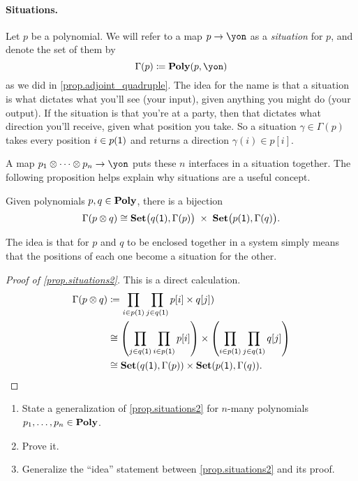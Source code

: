 \documentclass[Book-Poly]{subfiles}
\begin{document}
\paragraph{Situations.} %
Let $p$ be a polynomial. We will refer to a map $p\to\yon$ as a \emph{situation} for $p$, and denote the set of them by
\[
\Gamma(p)\coloneqq\poly(p,\yon)
\]
as we did in \cref{prop.adjoint_quadruple}. The idea for the name is that a situation is what dictates what you'll see (your input), given anything you might do (your output). If the situation is that you're at a party, then that dictates what direction you'll receive, given what position you take. So a situation $\gamma\in\Gamma(p)$ takes every position $i\in p(\textsf{1})$ and returns a direction $\gamma(i)\in p[i]$.

A map $p_1\otimes \cdots \otimes p_n\to\yon$ puts these $n$ interfaces in a situation together. The following proposition helps explain why situations are a useful concept.

\begin{proposition}\label{prop.situations2}
Given polynomials $p,q\in\mathbf{Poly}$, there is a bijection
\[
\Gamma(p\otimes q)\cong\mathbf{Set}\big(q(\textsf{1}),\Gamma(p)\big)\;\times\;\mathbf{Set}\big(p(\textsf{1}),\Gamma(q)\big).
\]
\end{proposition}
The idea is that for $p$ and $q$ to be enclosed together in a system simply means that the positions of each one become a situation for the other. 
\begin{proof}[Proof of \cref{prop.situations2}]
This is a direct calculation.
\begin{align*}
	\Gamma(p\otimes q) &\coloneqq
	\prod_{i\in p(\textsf{1})}\prod_{j\in q(\textsf{1})}p[i]\times q[j]) \\
	&\cong
	\left(\prod_{j\in q(\textsf{1})}\prod_{i\in p(\textsf{1})}p[i]\right)\times
		 \left(\prod_{i\in p(\textsf{1})}\prod_{j\in q(\textsf{1})}q[j]\right) \\
	&\cong
	\mathbf{Set}(q(\textsf{1}),\Gamma(p))\times\mathbf{Set}(p(\textsf{1}),\Gamma(q)).
\end{align*}
\end{proof}

\begin{exercise}
\begin{enumerate}
	\item State a generalization of \cref{prop.situations2} for $n$-many polynomials $p_1,\ldots,p_n\in\mathbf{Poly}$.
	\item Prove it.
	\item Generalize the ``idea'' statement between \cref{prop.situations2} and its proof.
\qedhere
\end{enumerate}
\end{exercise}
\end{document}
